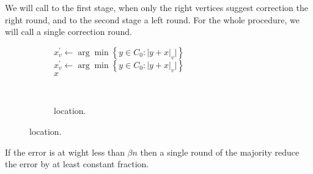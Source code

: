 \documentclass{beamer}
\begin{document}
\begin{frame}

  We will call to the first stage, when only the right vertices suggest correction the right round, and to the second stage a left round. For the whole procedure, we will call a single correction round.  

  
  \begin{figure}[h]
    \begin{subfigure}[h]{0.4\textwidth}

    \label{alg:three}
      \begin{algorithm}[H]
     {
      $x^{\prime}_{v} \leftarrow \arg\min {\left\{  y \in C_{0} : |y + x|_{v} |  \right\} } $\\
    }
     {
      $x^{\prime}_{v} \leftarrow \arg\min {\left\{  y \in C_{0} : |y + x|_{v} |  \right\} } $\\
    }
    \Return  $x $

  \end{algorithm}
    \end{subfigure}
    \begin{subfigure}[h]{0.1\textwidth}
      \
    \end{subfigure}
    \begin{subfigure}[h]{0.45\textwidth} 

\caption{location.}
    \label{fig:location}
    \end{subfigure} 
  \end{figure}

\end{frame}
\begin{frame}

  \begin{lemma}
    \label{lemma:reduce}
    If the error is at wight less than $\beta n $ then a single round of the  majority reduce the error by at least constant fraction. 
  \end{lemma}

\end{frame}
\end{document}
